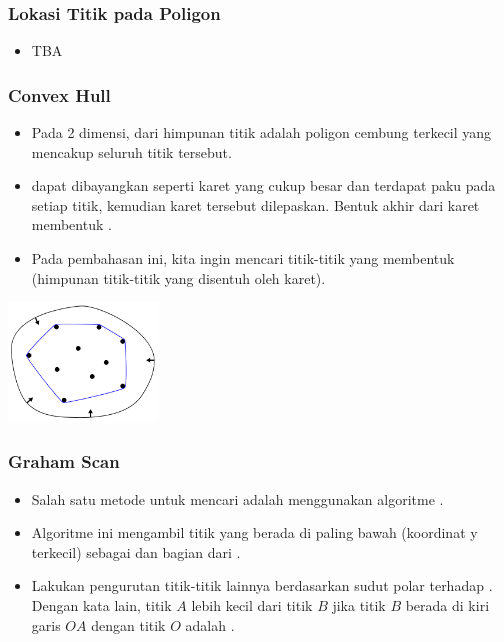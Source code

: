 \begin{frame}
\frametitle{Lokasi Titik pada Poligon}
\begin{itemize}
  \item TBA  %
\end{itemize}
\end{frame}

\begin{frame}
\frametitle{Convex Hull}
\begin{itemize}
  \item Pada 2 dimensi,  dari himpunan titik adalah poligon cembung terkecil yang mencakup seluruh titik tersebut.
  \item \fConvexHull dapat dibayangkan seperti karet yang cukup besar dan terdapat paku pada setiap titik, kemudian karet tersebut dilepaskan. Bentuk akhir dari karet membentuk \fconvexHull.
  \item Pada pembahasan ini, kita ingin mencari titik-titik yang membentuk \fconvexHull (himpunan titik-titik yang disentuh oleh karet).
\end{itemize}
\begin{center}
  \includegraphics[width=4cm]{asset/convex-hull.png}
\end{center}
\end{frame}

\begin{frame}
\frametitle{Graham Scan}
\begin{itemize}
  \item Salah satu metode untuk mencari \fconvexHull adalah menggunakan algoritme .
  \item Algoritme ini mengambil titik yang berada di paling bawah (koordinat y terkecil) sebagai \fpivot dan bagian dari \fconvexHull.
  \item Lakukan pengurutan titik-titik lainnya berdasarkan sudut polar terhadap \fpivot. Dengan kata lain, titik $A$ lebih kecil dari titik $B$ jika titik $B$ berada di kiri garis $OA$ dengan titik $O$ adalah \fpivot.
\end{itemize}
\end{frame}

